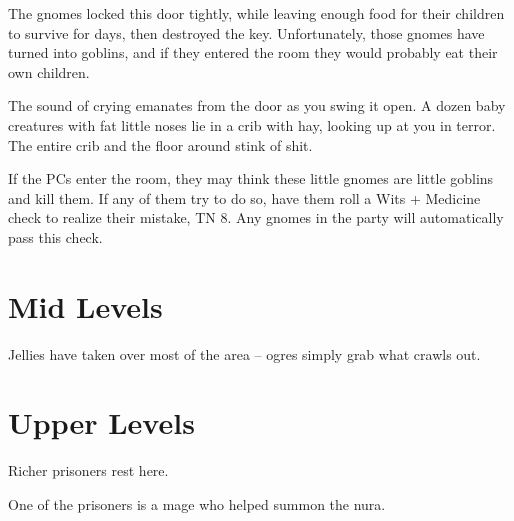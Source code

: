 \begin{multicols}{2}
\begin{exampletext}
	The gnomes locked this door tightly, while leaving enough food for their children to survive for days, then destroyed the key.
	Unfortunately, those gnomes have turned into goblins, and if they entered the room they would probably eat their own children.

\end{exampletext}

\begin{boxtext}

	The sound of crying emanates from the door as you swing it open.
	A dozen baby creatures with fat little noses lie in a crib with hay, looking up at you in terror.
	The entire crib and the floor around stink of shit.

\end{boxtext}

If the PCs enter the room, they may think these little gnomes are little goblins and kill them.
If any of them try to do so, have them roll a Wits + Medicine check to realize their mistake, TN 8.
Any gnomes in the party will automatically pass this check.

\end{multicols}


\label{laddertop}

\section{Mid Levels}

\begin{multicols}{2}


Jellies have taken over most of the area -- ogres simply grab what crawls out.

\jelly

\jelly


\end{multicols}

\section{Upper Levels}

\begin{multicols}{2}


Richer prisoners rest here.

One of the prisoners is a mage who helped summon the nura.

\humandiplomat


\umberhulk

\end{multicols}

